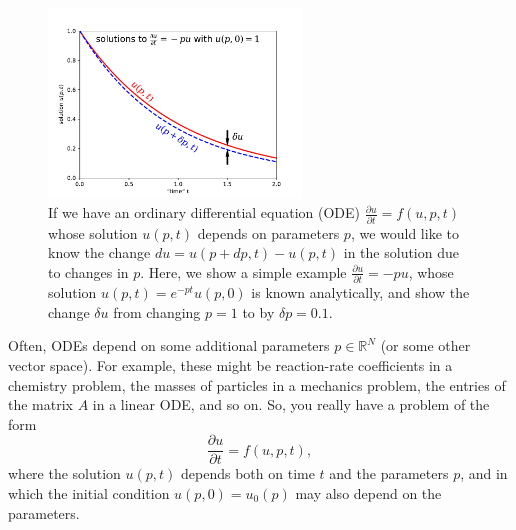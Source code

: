 \begin{figure}
    \centering
\includegraphics[width=0.6\textwidth]{figures/ode-fig.pdf}
    \caption{If we have an ordinary differential equation (ODE) $\frac{\partial u}{\partial t} = f(u, p, t)$ whose solution $u(p, t)$ depends on parameters $p$, we would like to know the change $d u = u(p + d p, t) - u(p, t)$ in the solution due to changes in $p$.  Here, we show a simple example $\frac{\partial u}{\partial t} = -pu$, whose solution $u(p,t) = e^{-p t} u(p,0)$ is known analytically, and show the change $\delta u$ from changing $p=1$ to by $\delta p = 0.1$.}
    \label{fig:ode}
\end{figure}

Often, ODEs depend on some additional parameters $p\in\mathbb{R}^{N}$
(or some other vector space). For example, these might be reaction-rate
coefficients in a chemistry problem, the masses of particles in a
mechanics problem, the entries of the matrix $A$ in a linear ODE,
and so on. So, you really have a problem of the form
\[
\frac{\partial u}{\partial t}=f(u,p,t),
\]
where the solution $u(p,t)$ depends both on time $t$ and the parameters
$p$, and in which the initial condition $u(p,0)=u_{0}(p)$ may also
depend on the parameters.

